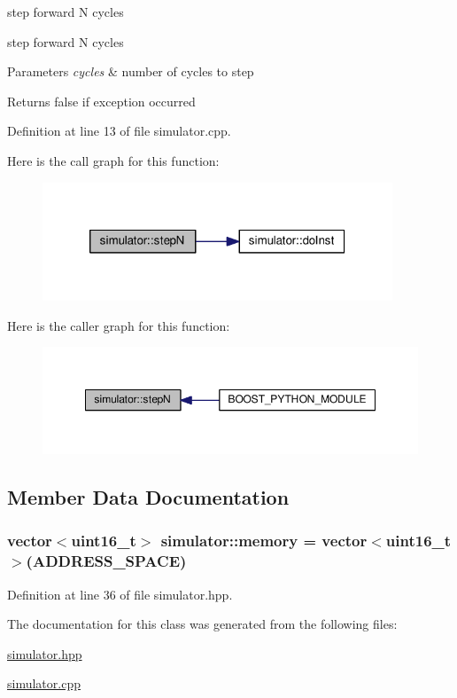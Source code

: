 step forward N cycles 

step forward N cycles


\begin{DoxyParams}{Parameters}
{\em cycles} & number of cycles to step \\
\hline
\end{DoxyParams}
\begin{DoxyReturn}{Returns}
false if exception occurred 
\end{DoxyReturn}


Definition at line 13 of file simulator.\-cpp.



Here is the call graph for this function\-:
\nopagebreak
\begin{figure}[H]
\begin{center}
\leavevmode
\includegraphics[width=296pt]{classsimulator_a0b627c7dfa086c2e712447f6f52df45a_cgraph}
\end{center}
\end{figure}




Here is the caller graph for this function\-:
\nopagebreak
\begin{figure}[H]
\begin{center}
\leavevmode
\includegraphics[width=350pt]{classsimulator_a0b627c7dfa086c2e712447f6f52df45a_icgraph}
\end{center}
\end{figure}




\subsection{Member Data Documentation}
\hypertarget{classsimulator_a7c49313a87678b1737725b6bf695119d}{
\subsubsection[{memory}]{\setlength{\rightskip}{0pt plus 5cm}vector$<$uint16\-\_\-t$>$ simulator\-::memory = vector$<$uint16\-\_\-t$>$({\bf A\-D\-D\-R\-E\-S\-S\-\_\-\-S\-P\-A\-C\-E})}}\label{classsimulator_a7c49313a87678b1737725b6bf695119d}


Definition at line 36 of file simulator.\-hpp.



The documentation for this class was generated from the following files\-:\begin{DoxyCompactItemize}
\item 
\hyperlink{simulator_8hpp}{simulator.\-hpp}\item 
\hyperlink{simulator_8cpp}{simulator.\-cpp}\end{DoxyCompactItemize}
